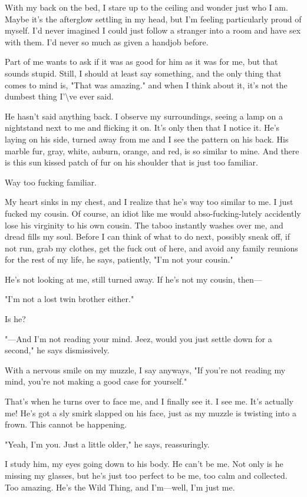 With my back on the bed, I stare up to the ceiling and wonder just who I am. Maybe it's the afterglow settling in my head, but I'm feeling particularly proud of myself. I'd never imagined I could just follow a stranger into a room and have sex with them. I'd never so much as given a handjob before.

Part of me wants to ask if it was as good for him as it was for me, but that sounds stupid. Still, I should at least say something, and the only thing that comes to mind is, "That was amazing." and when I think about it, it's not the dumbest thing I'\textbackslash ve ever said.

He hasn't said anything back. I observe my surroundings, seeing a lamp on a nightstand next to me and flicking it on. It's only then that I notice it. He's laying on his side, turned away from me and I see the pattern on his back. His marble fur, gray, white, auburn, orange, and red, is so similar to mine. And there is this sun kissed patch of fur on his shoulder that is just too familiar.

Way too fucking familiar.

My heart sinks in my chest, and I realize that he's way too similar to me. I just fucked my cousin. Of course, an idiot like me would abso-fucking-lutely accidently lose his virginity to his own cousin. The taboo instantly washes over me, and dread fills my soul. Before I can think of what to do next, possibly sneak off, if not run, grab my clothes, get the fuck out of here, and avoid any family reunions for the rest of my life, he says, patiently, "I'm not your cousin."

He's not looking at me, still turned away. If he's not my cousin, then---

"I'm not a lost twin brother either."

Is he?

"---And I'm not reading your mind. Jeez, would you just settle down for a second," he says dismissively.

With a nervous smile on my muzzle, I say anyways, "If you're not reading my mind, you're not making a good case for yourself."

That's when he turns over to face me, and I finally see it. I see me. It's actually me! He's got a sly smirk slapped on his face, just as my muzzle is twisting into a frown. This cannot be happening.

"Yeah, I'm you. Just a little older," he says, reassuringly.

I study him, my eyes going down to his body. He can't be me. Not only is he missing my glasses, but he's just too perfect to be me, too calm and collected. Too amazing. He's the Wild Thing, and I'm---well, I'm just me.

